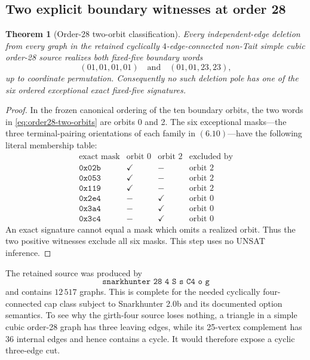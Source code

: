 \documentclass[11pt]{article}
\newtheorem{theorem}{Theorem}[section]
\theoremstyle{definition}
\theoremstyle{remark}
\begin{document}
\subsection{Two explicit boundary witnesses at order 28}

\begin{theorem}[Order-28 two-orbit classification]
\label{thm:cyclic4-order28}
Every independent-edge deletion from every graph in the retained
cyclically \(4\)-edge-connected non-Tait simple cubic order-28 source
realizes both fixed-five boundary words
\[
                       (01,01,01,01)
             \quad\text{and}\quad
                       (01,01,23,23),                         \tag{7.1}
\label{eq:order28-two-orbits}
\]
up to coordinate permutation.  Consequently no such deletion pole has
one of the six ordered exceptional exact fixed-five signatures.
\end{theorem}

\begin{proof}
In the frozen canonical ordering of the ten boundary orbits, the two
words in \eqref{eq:order28-two-orbits} are orbits 0 and 2.  The six
exceptional masks---the three terminal-pairing orientations of each
family in \((6.10)\)---have the following literal membership table:
\[
\begin{array}{c|cc|c}
\text{exact mask}&\text{orbit 0}&\text{orbit 2}&\text{excluded by}\\ \hline
\texttt{0x02b}&\checkmark&-&\text{orbit 2}\\
\texttt{0x053}&\checkmark&-&\text{orbit 2}\\
\texttt{0x119}&\checkmark&-&\text{orbit 2}\\
\texttt{0x2e4}&-&\checkmark&\text{orbit 0}\\
\texttt{0x3a4}&-&\checkmark&\text{orbit 0}\\
\texttt{0x3c4}&-&\checkmark&\text{orbit 0}
\end{array}                                                   \tag{7.2}
\]
An exact signature cannot equal a mask which omits a realized orbit.
Thus the two positive witnesses exclude all six masks.  This step uses
no UNSAT inference.
\end{proof}

The retained source was produced by
\[
                 \texttt{snarkhunter 28 4 S s C4 o g}
\]
and contains \(12\,517\) graphs.  This is complete for the needed
cyclically four-connected cap class subject to Snarkhunter 2.0b and its
documented option semantics.  To see why the girth-four source loses
nothing, a triangle in a simple cubic order-28 graph has three leaving
edges, while its 25-vertex complement has 36 internal edges and hence
contains a cycle.  It would therefore expose a cyclic three-edge cut.
\end{document}
